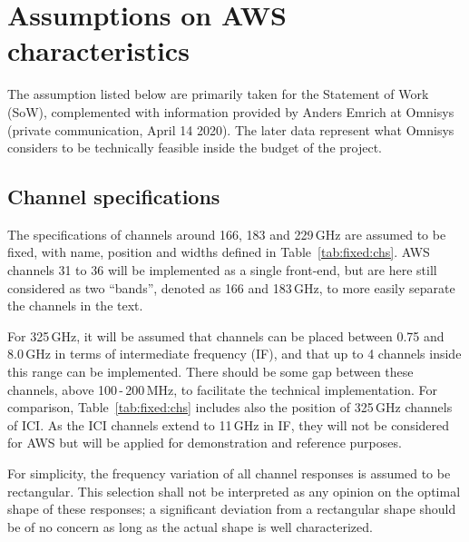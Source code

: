 \documentclass[12pt]{article}
\begin{document}
\section{Assumptions on AWS characteristics}
%
The assumption listed below are primarily taken for the Statement of Work
(SoW), complemented with information provided by Anders Emrich at Omnisys
(private communication, April 14 2020). The later data represent what Omnisys
considers to be technically feasible inside the budget of the project.

\subsection{Channel specifications}
%
The specifications of channels around 166, 183 and 229\,GHz are assumed to
be fixed, with name, position and widths defined in Table~\ref{tab:fixed:chs}.
AWS channels 31 to 36 will be implemented as a single front-end, but are here
still considered as two ``bands'', denoted as 166 and 183\,GHz, to more easily
separate the channels in the text. 

For 325\,GHz, it will be assumed that channels can be placed between 0.75 and
8.0\,GHz in terms of intermediate frequency (IF), and that up to 4 channels
inside this range can be implemented. There should be some gap between these
channels, above 100\,-\,200\,MHz, to facilitate the technical implementation.
For comparison, Table~\ref{tab:fixed:chs} includes also the position of 
325\,GHz channels of ICI. As the ICI channels extend to 11\,GHz in IF, they will not
be considered for AWS but will be applied for demonstration and reference
purposes.

For simplicity, the frequency variation of all channel responses is assumed to
be rectangular. This selection shall not be interpreted as any opinion on the
optimal shape of these responses; a significant deviation from a rectangular
shape should be of no concern as long as the actual shape is well
characterized.
\end{document}
